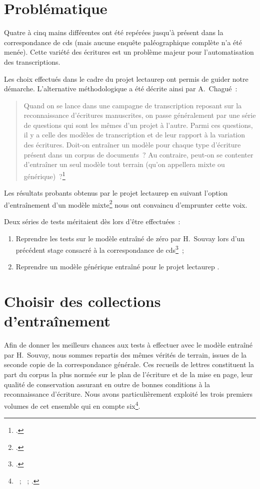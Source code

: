 \documentclass[a4paper,12pt,twoside]{book}
\begin{document}
		\section{Problématique}
			Quatre à cinq mains différentes ont été repérées jusqu'à présent dans la correspondance de \gls{cds} (mais aucune enquête paléographique complète n'a été menée). Cette variété des écritures est un problème majeur pour l'automatisation des transcriptions.
			
			Les choix effectués dans le cadre du projet \gls{lectaurep} ont permis de guider notre démarche. L'alternative méthodologique a été décrite ainsi par A.~Chagué~:
			
			\begin{quotation}
				Quand on se lance dans une campagne de transcription reposant sur la reconnaissance d’écritures manuscrites, on passe généralement par une série de questions qui sont les mêmes d’un projet à l’autre. Parmi ces questions, il y a celle des modèles de transcription et de leur rapport à la variation des écritures. Doit-on entraîner un modèle pour chaque type d’écriture présent dans un corpus de documents~? Au contraire, peut-on se contenter d’entraîner un seul modèle tout terrain (qu’on appellera mixte ou générique)~?\footcite{chagueCreationModelesTranscription}
			\end{quotation}
		
			Les résultats probants obtenus par le projet \gls{lectaurep} en suivant l'option d'entraînement d'un modèle mixte\footcite{chagueCreationModelesTranscriptiona} nous ont convaincu d'emprunter cette voix.
		
			Deux séries de tests méritaient dès lors d'être effectuées~:
	
			\begin{enumerate}
				\item Reprendre les tests sur le modèle entraîné de zéro par H.~Souvay lors d'un précédent stage consacré à la correspondance de \gls{cds}\footcite{souvayCorrespondanceConstanceSalm2021}~;
				\item Reprendre un modèle générique entraîné pour le projet \gls{lectaurep} .
			\end{enumerate}
				
		\section{Choisir des collections d'entraînement}
			Afin de donner les meilleurs chances aux tests à effectuer avec le modèle entraîné par H.~Souvay, nous sommes repartis des mêmes vérités de terrain, issues de la seconde copie de la correspondance générale. 	 Ces recueils de lettres constituent la part du corpus la plus normée sur le plan de l'écriture et de la mise en page, leur qualité de conservation assurant en outre de bonnes conditions à la reconnaissance d'écriture. Nous avons particulièrement exploité les trois premiers volumes de cet ensemble qui en compte six\footnote{\cite{salmCorrespondanceGeneraleSecondea}~; \cite{salmCorrespondanceGeneraleSeconde}~; \cite{salmCorrespondanceGeneraleSecondeb}.}.
			
\end{document}
